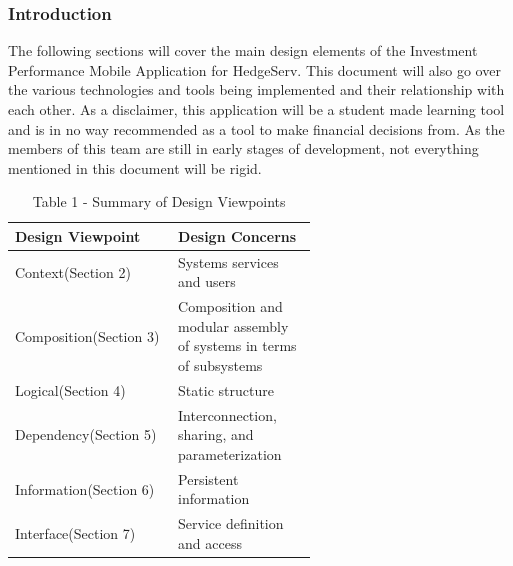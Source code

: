 \documentclass[onecolumn, draftclsnofoot,10pt, compsoc]{IEEEtran}
\begin{document}
\subsubsection{Introduction}

    The following sections will cover the main design elements of the Investment Performance Mobile
    Application for HedgeServ. This document will also go over the various technologies and tools being implemented and their
    relationship with each other. As a disclaimer, this application will be a student made learning tool and is in
    no way recommended as a tool  to make financial decisions from. As the members of this team are still in early stages of development,
    not everything mentioned in this document will be rigid. 
      
\begin{table}[h]
                        \caption{Table 1 - Summary of Design Viewpoints}
                        \centering
                                \begin{tabular}{| p{0.3\linewidth} | p{0.3\linewidth} | }
                                        \hline
                                         \textbf{Design Viewpoint} & \textbf{Design Concerns}\\ [0.5ex]
                                        \hline
                                        Context(Section 2)  & Systems services and users\\
                                        \hline
                                         Composition(Section 3) & Composition and modular assembly of systems in terms of subsystems\\
                                        \hline
                                         Logical(Section 4) & Static structure\\
                                        \hline
                                        Dependency(Section 5) & Interconnection, sharing, and parameterization\\
                                        \hline
                                        Information(Section 6) & Persistent information\\
                                        \hline
                                        Interface(Section 7) & Service definition and access\\
                                        \hline
                                \end{tabular}
\end{table}     
\end{document}
